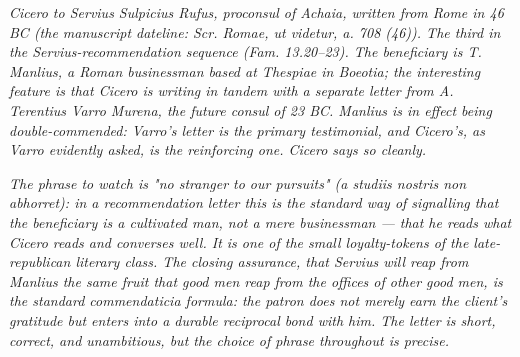 
\textit{Cicero to Servius Sulpicius Rufus, proconsul of
Achaia, written from Rome in 46 BC (the manuscript
dateline: \textit{Scr. Romae, ut videtur, a. 708 (46)}).
The third in the Servius-recommendation sequence (Fam.
13.20--23). The beneficiary is T. Manlius, a Roman
businessman based at Thespiae in Boeotia; the
interesting feature is that Cicero is writing in tandem
with a separate letter from A. Terentius Varro Murena,
the future consul of 23 BC. Manlius is in effect being
double-commended: Varro's letter is the primary
testimonial, and Cicero's, as Varro evidently asked, is
the reinforcing one. Cicero says so cleanly.}

\textit{The phrase to watch is "no stranger to our
pursuits" (\textit{a studiis nostris non abhorret}): in
a recommendation letter this is the standard way of
signalling that the beneficiary is a cultivated man,
not a mere businessman --- that he reads what Cicero
reads and converses well. It is one of the small
loyalty-tokens of the late-republican literary class.
The closing assurance, that Servius will reap from
Manlius the same fruit that good men reap from the
offices of other good men, is the standard
\textit{commendaticia} formula: the patron does not
merely earn the client's gratitude but enters into a
durable reciprocal bond with him. The letter is short,
correct, and unambitious, but the choice of phrase
throughout is precise.}
